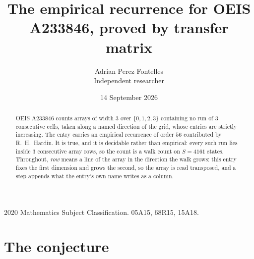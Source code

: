 \documentclass[11pt,a4paper]{article}
\title{The empirical recurrence for OEIS A233846, proved by transfer matrix}
\author{Adrian Perez Fontelles\\ \small Independent researcher}
\date{14 September 2026}
\theoremstyle{plain}
\theoremstyle{definition}
\begin{document}
\maketitle

\begin{abstract}
OEIS A233846 counts arrays of width $3$ over $\{0,1,2,3\}$ containing no run of $3$ consecutive
cells, taken along a named direction of the grid, whose entries are strictly increasing. The entry carries
an empirical recurrence of order $56$ contributed by R.~H.~Hardin. It is true, and it is
decidable rather than empirical: every such run lies inside $3$ consecutive array rows, so
the count is a walk count on $S=4161$ states.
 Throughout, \emph{row} means a line of the array in the direction the walk grows: this entry fixes the first dimension and grows the second, so the array is read transposed, and a step appends what the entry's own name writes as a column.\end{abstract}

\noindent\small 2020 Mathematics Subject Classification. 05A15, 68R15, 15A18.\normalsize

\section{The conjecture}
\end{document}
